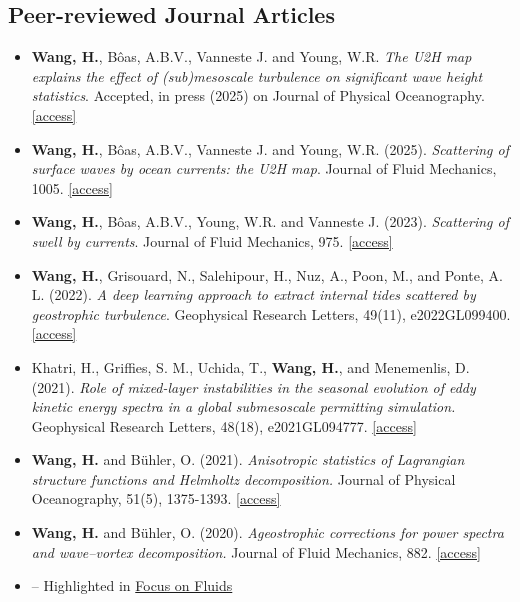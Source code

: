 \documentclass[a4paper,12pt]{article}
\begin{document}
\subsection{Peer-reviewed Journal Articles}
\begin{itemize}
\item \textbf{Wang, H.}, B\^{o}as, A.B.V.,  Vanneste J. and Young, W.R. \textit{The U2H map explains the effect of (sub)mesoscale turbulence on significant wave height statistics}. Accepted, in press (2025) on Journal of Physical Oceanography. \href{https://arxiv.org/abs/2504.21736}{[access]}
\item \textbf{Wang, H.}, B\^{o}as, A.B.V.,  Vanneste J. and Young, W.R. (2025). \textit{Scattering of surface waves by ocean currents: the U2H map}. Journal of Fluid Mechanics,  1005. \href{https://arxiv.org/abs/2402.05652}{[access]}
\item \textbf{Wang, H.}, B\^{o}as, A.B.V., Young, W.R. and Vanneste J. (2023). \textit{Scattering of swell by currents}. Journal of Fluid Mechanics, 975.  \href{https://arxiv.org/abs/2305.12163}{[access]}
\item \textbf{Wang, H.}, Grisouard, N., Salehipour, H., Nuz, A., Poon, M., and Ponte, A. L. (2022). \textit{A deep learning approach to extract internal tides scattered by geostrophic turbulence}. Geophysical Research Letters, 49(11), e2022GL099400. \href{https://essopenarchive.org/doi/full/10.1002/essoar.10508849.2}{[access]}
\item Khatri, H., Griffies, S. M., Uchida, T., \textbf{Wang, H.},  and Menemenlis, D. (2021). \textit{Role of mixed-layer instabilities in the seasonal evolution of eddy kinetic energy spectra in a global submesoscale permitting simulation.} Geophysical Research Letters, 48(18), e2021GL094777. \href{https://repository.library.noaa.gov/view/noaa/43143}{[access]}
\item \textbf{Wang, H.} and B{\"u}hler, O. (2021). \textit{Anisotropic statistics of Lagrangian structure functions and Helmholtz decomposition.} Journal of Physical Oceanography, 51(5), 1375-1393. \href{https://hannnwang.github.io/WangBuhlerJPO21.pdf}{[access]}
\item \textbf{Wang, H.} and B{\"u}hler, O. (2020). \textit{Ageostrophic corrections for power spectra and wave–vortex decomposition.} Journal of Fluid Mechanics, 882. \href{https://hannnwang.github.io/AgeoSpectraJFM20.pdf}{[access]}
\item[] -- Highlighted in \href{https://www.cambridge.org/core/journals/journal-of-fluid-mechanics/article/untangling-waves-and-vortices-in-the-atmospheric-kinetic-energy-spectra/1BEB1ABC32CD2CFAB99BAFEE4712CD0C}{Focus on Fluids}
\end{itemize}
\end{document}
